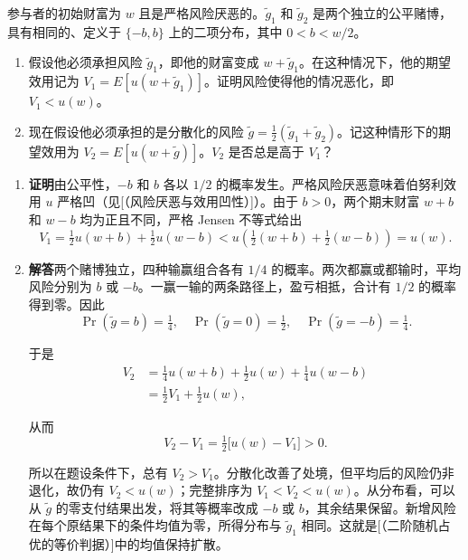 \begin{problem}
 参与者的初始财富为 $w$ 且是严格风险厌恶的。$\tilde{g}_{1}$ 和 $\tilde{g}_{2}$ 是两个独立的公平赌博，具有相同的、定义于 $\{-b,b\}$ 上的二项分布，其中 $0<b<w/2$。
\begin{enumerate}[label=(\alph*)]
    \item 假设他必须承担风险 $\tilde{g}_{1}$，即他的财富变成 $w+\tilde{g}_{1}$。在这种情况下，他的期望效用记为 $V_{1}=E[u(w+\tilde{g}_{1})]$。证明风险使得他的情况恶化，即 $V_{1}<u(w)$。
    \item 现在假设他必须承担的是分散化的风险 $\tilde{g}=\frac12(\tilde{g}_{1}+\tilde{g}_{2})$。记这种情形下的期望效用为 $V_{2}=E[u(w+\tilde{g})]$。$V_{2}$ 是否总是高于 $V_{1}$？
\end{enumerate}
\end{problem}
\begin{solution}[blank-type=manual,blank-vsep=7\baselineskip]
\begin{enumerate}[label=(\alph*)]
\item \textbf{证明}\quad 由公平性，$-b$ 和 $b$ 各以 $1/2$ 的概率发生。严格风险厌恶意味着伯努利效用 $u$ 严格凹\ifdefined\WJHandoutKnowledge（见[（风险厌恶与效用凹性）]）\fi。由于 $b>0$，两个期末财富 $w+b$ 和 $w-b$ 均为正且不同，严格 Jensen 不等式给出
\[
 V_1=\tfrac12u(w+b)+\tfrac12u(w-b)
 <u\left(\tfrac12(w+b)+\tfrac12(w-b)\right)=u(w).
\]

\item \textbf{解答}\quad 两个赌博独立，四种输赢组合各有 $1/4$ 的概率。两次都赢或都输时，平均风险分别为 $b$ 或 $-b$。一赢一输的两条路径上，盈亏相抵，合计有 $1/2$ 的概率得到零。因此
\[
 \Pr(\tilde g=b)=\tfrac14,\quad
 \Pr(\tilde g=0)=\tfrac12,\quad
 \Pr(\tilde g=-b)=\tfrac14.
\]

于是
\[
 \begin{aligned}
 V_2&=\tfrac14u(w+b)+\tfrac12u(w)+\tfrac14u(w-b)\\
 &=\tfrac12V_1+\tfrac12u(w),
 \end{aligned}
\]

从而
\[
  V_2-V_1=\tfrac12\bigl[u(w)-V_1\bigr]>0.
\]

所以在题设条件下，总有 $V_2>V_1$。分散化改善了处境，但平均后的风险仍非退化，故仍有 $V_2<u(w)$；完整排序为 $V_1<V_2<u(w)$。从分布看，可以从 $\tilde g$ 的零支付结果出发，将其等概率改成 $-b$ 或 $b$，其余结果保留。新增风险在每个原结果下的条件均值为零，所得分布与 $\tilde g_1$ 相同。\ifdefined\WJHandoutKnowledge 这就是[（二阶随机占优的等价判据）]中的均值保持扩散。\fi
\end{enumerate}
\end{solution}

